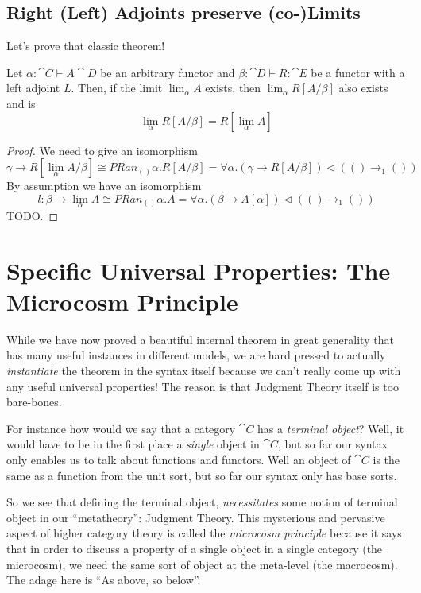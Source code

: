 \documentclass{article}
\begin{document}
\subsection{Right (Left) Adjoints preserve (co-)Limits}

Let's prove that classic theorem!

\begin{theorem}
  Let $\alpha : \cat C \vdash A \cat D$ be an arbitrary functor and
  $\beta : \cat D \vdash R : \cat E$ be a functor with a left adjoint
  $L$. Then, if the limit $\lim_\alpha A$ exists, then $\lim_\alpha
  R[A/\beta]$ also exists and is
  \[ \lim_\alpha R[A/\beta] = R[\lim_\alpha A] \]
\end{theorem}
\begin{proof}
  We need to give an isomorphism
  \[ \gamma \to R[\lim_\alpha A/\beta] \cong PRan_{()}{\alpha. R[A/\beta]} = \forall \alpha. (\gamma \to R[A/\beta]) \triangleleft (() \to_1 ()) \]
  By assumption we have an isomorphism
  \[ l : \beta \to \lim_\alpha A \cong PRan_{()}{\alpha. A} = \forall \alpha. (\beta \to A[\alpha]) \triangleleft (()\to_1 ())\]
  TODO.
\end{proof}

\section{Specific Universal Properties: The Microcosm Principle}

While we have now proved a beautiful internal theorem in great
generality that has many useful instances in different models, we are
hard pressed to actually \emph{instantiate} the theorem in the syntax
itself because we can't really come up with any useful universal properties!
The reason is that Judgment Theory itself is too bare-bones.

For instance how would we say that a category $\cat C$ has a
\emph{terminal object}? Well, it would have to be in the first place a
\emph{single} object in $\cat C$, but so far our syntax only enables
us to talk about functions and functors. Well an object of $\cat C$ is
the same as a function from the unit sort, but so far our syntax only
has base sorts.

So we see that defining the terminal object, \emph{necessitates} some
notion of terminal object in our ``metatheory'': Judgment Theory.
This mysterious and pervasive aspect of higher category theory is
called the \emph{microcosm principle} because it says that in order to
discuss a property of a single object in a single category (the
microcosm), we need the same sort of object at the meta-level (the
macrocosm). The adage here is ``As above, so below''.
\end{document}
